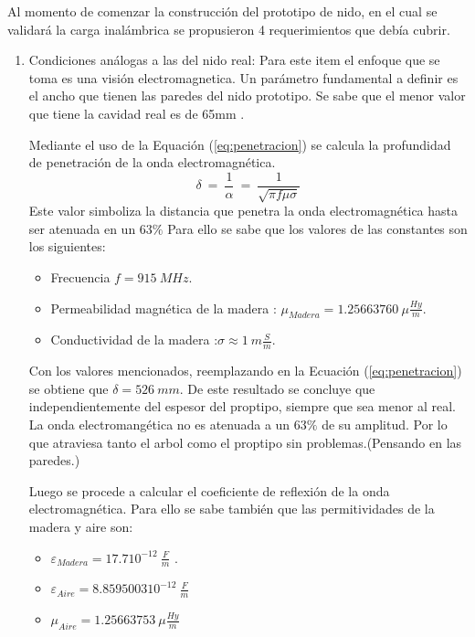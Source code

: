 %

Al momento de comenzar la construcci\'on del prototipo de nido, en el cual se validar\'a la carga inal\'ambrica se propusieron 4 requerimientos que deb\'ia cubrir.
\begin{enumerate}
\item Condiciones an\'alogas a las del nido real:
Para este item el enfoque que se toma es una visi\'on electromagnetica.
Un parámetro fundamental a definir es el ancho que tienen las paredes del nido prototipo. Se sabe que el menor valor que tiene la cavidad real es de 65mm \cite{ref:PaperValeriaOjeda}.

Mediante el uso de la Equación (\ref{eq:penetracion}) se calcula la profundidad de penetración de la onda electromagnética.
\begin{equation}
\delta \ = \ \frac{1}{\alpha} \ =\ \frac{1}{\sqrt{\pi f \mu \sigma}}
\label{eq:penetracion}
\end{equation}
Este valor simboliza la distancia que penetra la onda electromagn\'etica hasta ser atenuada en un 63$\%$
Para ello se sabe que los valores de las constantes son los siguientes:
\begin{itemize}
	\item Frecuencia $f = 915 \ MHz$.
	\item Permeabilidad magnética de la madera \cite{ref:permeabilidad_madera}: $\mu_{Madera} = 1.25663760 \ \mu \frac{Hy}{m}$.
	\item Conductividad de la madera \cite{ref:conductividad_madera}:$\sigma \approx 1 \ m\frac{S}{m}$.
\end{itemize}

Con los valores mencionados, reemplazando en la Ecuación (\ref{eq:penetracion}) se obtiene que $\delta = 526 \ mm$.
De este resultado se concluye que independientemente del espesor del proptipo, siempre que sea menor al real. La onda electromang\'etica no es atenuada a un 63$\%$ de su amplitud. Por lo que atraviesa tanto el arbol como el proptipo sin problemas.(Pensando en las paredes.)

Luego se procede a calcular el coeficiente de reflexión de la onda electromagnética. Para ello se sabe también que las permitividades de la madera y aire son:
\begin{itemize}
	\item $\varepsilon_{Madera} = 17.7 10^{-12} \ \frac{F}{m}$ \cite{ref:varepsilon_madera}.
	\item $\varepsilon_{Aire} = 8.8595003 10^{-12} \ \frac{F}{m}$
	\item $\mu_{Aire} = 1.25663753 \ \mu \frac{ Hy}{m}$ 
\end{itemize}


\end{enumerate}
